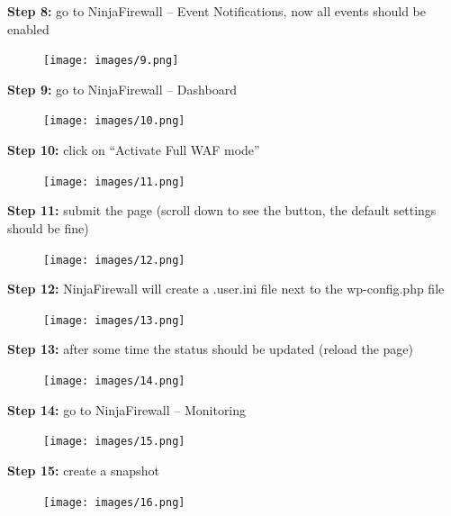 \documentclass[a4paper]{article}
\begin{document}
\noindent
\textbf{Step 8:} go to NinjaFirewall -- Event Notifications, now all events should be enabled

\begin{figure}[H]
  \centering
  \texttt{[image: images/9.png]}
\end{figure}

\newpage

\noindent
\textbf{Step 9:} go to NinjaFirewall -- Dashboard

\begin{figure}[H]
  \centering
  \texttt{[image: images/10.png]}
\end{figure}

\noindent
\textbf{Step 10:} click on \enquote{Activate Full WAF mode}

\begin{figure}[H]
  \centering
  \texttt{[image: images/11.png]}
\end{figure}

\noindent
\textbf{Step 11:} submit the page (scroll down to see the button, the default settings should be fine)

\begin{figure}[H]
  \centering
  \texttt{[image: images/12.png]}
\end{figure}

\noindent
\textbf{Step 12:} NinjaFirewall will create a .user.ini file next to the wp-config.php file

\begin{figure}[H]
  \centering
  \texttt{[image: images/13.png]}
\end{figure}

\newpage

\noindent
\textbf{Step 13:} after some time the status should be updated (reload the page)

\begin{figure}[H]
  \centering
  \texttt{[image: images/14.png]}
\end{figure}

\noindent
\textbf{Step 14:} go to NinjaFirewall -- Monitoring

\begin{figure}[H]
  \centering
  \texttt{[image: images/15.png]}
\end{figure}

\noindent
\textbf{Step 15:} create a snapshot

\begin{figure}[H]
  \centering
  \texttt{[image: images/16.png]}
\end{figure}
\end{document}
